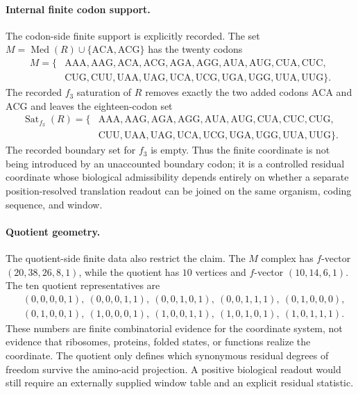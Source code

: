 \paragraph{Internal finite codon support.}
The codon-side finite support is explicitly recorded.  The set $M=\operatorname{Med}(R)\cup\{\mathrm{ACA},\mathrm{ACG}\}$ has the twenty codons
$$
\begin{aligned}
M=\{&\mathrm{AAA},\mathrm{AAG},\mathrm{ACA},\mathrm{ACG},\mathrm{AGA},\mathrm{AGG},\mathrm{AUA},\mathrm{AUG},\mathrm{CUA},\mathrm{CUC},\\
&\mathrm{CUG},\mathrm{CUU},\mathrm{UAA},\mathrm{UAG},\mathrm{UCA},\mathrm{UCG},\mathrm{UGA},\mathrm{UGG},\mathrm{UUA},\mathrm{UUG}\}.
\end{aligned}
$$
The recorded $f_3$ saturation of $R$ removes exactly the two added codons $\mathrm{ACA}$ and $\mathrm{ACG}$ and leaves the eighteen-codon set
$$
\begin{aligned}
\operatorname{Sat}_{f_3}(R)=\{&\mathrm{AAA},\mathrm{AAG},\mathrm{AGA},\mathrm{AGG},\mathrm{AUA},\mathrm{AUG},\mathrm{CUA},\mathrm{CUC},\mathrm{CUG},\\
&\mathrm{CUU},\mathrm{UAA},\mathrm{UAG},\mathrm{UCA},\mathrm{UCG},\mathrm{UGA},\mathrm{UGG},\mathrm{UUA},\mathrm{UUG}\}.
\end{aligned}
$$
The recorded boundary set for $f_3$ is empty.  Thus the finite coordinate is not being introduced by an unaccounted boundary codon; it is a controlled residual coordinate whose biological admissibility depends entirely on whether a separate position-resolved translation readout can be joined on the same organism, coding sequence, and window.

\paragraph{Quotient geometry.}
The quotient-side finite data also restrict the claim.  The $M$ complex has $f$-vector $(20,38,26,8,1)$, while the quotient has $10$ vertices and $f$-vector $(10,14,6,1)$.  The ten quotient representatives are
$$
\begin{aligned}
&(0,0,0,0,1),\ (0,0,0,1,1),\ (0,0,1,0,1),\ (0,0,1,1,1),\ (0,1,0,0,0),\\
&(0,1,0,0,1),\ (1,0,0,0,1),\ (1,0,0,1,1),\ (1,0,1,0,1),\ (1,0,1,1,1).
\end{aligned}
$$
These numbers are finite combinatorial evidence for the coordinate system, not evidence that ribosomes, proteins, folded states, or functions realize the coordinate.  The quotient only defines which synonymous residual degrees of freedom survive the amino-acid projection.  A positive biological readout would still require an externally supplied window table and an explicit residual statistic.

